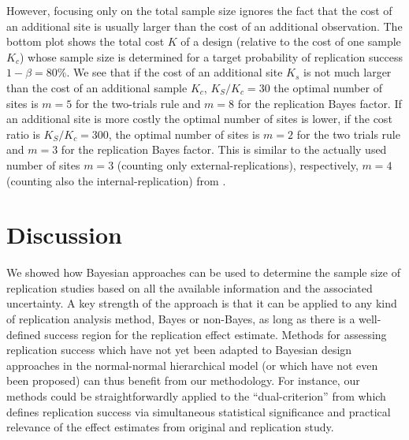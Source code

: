However, focusing only on the total sample size ignores the fact that the cost
of an additional site is usually larger than the cost of an additional
observation. The bottom plot shows the total cost $K$ of a design (relative to
the cost of one sample $K_{c}$) whose sample size is determined for a target
probability of replication success $1 - \beta = 80$\%.
We see that if the cost of an additional site $K_{s}$ is not much larger than
the cost of an additional sample $K_{c}$, \eg{} $K_{S}/K_{c} = 30$ %
the optimal number of sites is $m = 5$ for the two-trials rule and $m = 8$ for
the replication Bayes factor. If an additional site is more costly the optimal
number of sites is lower, \eg{} if the cost ratio is $K_{S}/K_{c} = 300$,
the optimal number of sites is $m = 2$ for the two trials rule and $m = 3$ for
the replication Bayes factor. This is similar to the actually used number of
sites $m = 3$ (counting only external-replications), respectively, $m = 4$
(counting also the internal-replication) from \citet{Protzko2020}.

\section{Discussion}
\label{sec:discussion}

We showed how Bayesian approaches can be used to determine the sample size of
replication studies based on all the available information and the associated
uncertainty. %
A key strength of the approach is that it can be applied to any kind of
replication analysis method, Bayes or non-Bayes, as long as there is a
well-defined success region for the replication effect estimate. Methods for
assessing replication success which have not yet been adapted to Bayesian design
approaches in the normal-normal hierarchical model (or which have not even been
proposed) can thus benefit from our methodology. For instance, our methods could
be straightforwardly applied to the ``dual-criterion'' from
\citet{Rosenkranz2021} which defines replication success via simultaneous
statistical significance and practical relevance of the effect estimates from
original and replication study.

